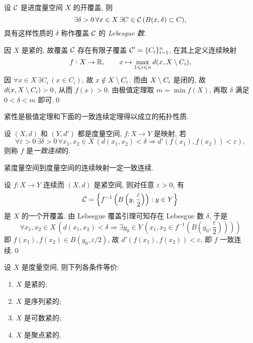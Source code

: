     \begin{Theorem}
        设 $ \mathcal{C} $ 是进度量空间 $ X $ 的开覆盖, 则
        \[
            \exists\delta >0\,\forall x\in X\,\exists C\in\mathcal{C}\,(B(x,\delta)\subset C),
        \]
        具有这样性质的 $ \delta $ 称作覆盖 $ \mathcal{C} $ 的 \emph{Lebesgue 数}.
    \end{Theorem}
    \begin{Proof}
        因 $ X $ 是紧的, 故覆盖 $ \mathcal{C} $ 存在有限子覆盖 $ \mathcal{C}'=\{C_i\}_{i=1}^n $, 在其上定义连续映射
        \[
            f : X\to\mathbb{R},\qquad x\mapsto\max_{1\leqslant i\leqslant n}d(x,X\setminus C_i),
        \]
        因 $ \forall x\in X\,\exists C_i\,(x\in C_i) $, 故 $ x\notin X\setminus C_i $. 而由 $ X\setminus C_i $ 是闭的, 故 $ d(x,X\setminus C_i)>0 $, 从而 $ f(x)>0 $. 由极值定理取 $ m=\min f(X) $, 再取 $ \delta $ 满足 $ 0<\delta<m $ 即可.\qed
    \end{Proof}

    紧性是极值定理和下面的一致连续定理得以成立的拓扑性质.

    \begin{Definition}[一致连续映射]
        设 $ (X,d) $ 和 $ (Y,d') $ 都是度量空间, $ f : X\to Y $ 是映射, 若
        \[
            \forall\varepsilon>0\,\exists\delta>0\,\forall x_1,x_2\in X\,(d(x_1,x_2)<\delta\Rightarrow d'(f(x_1),f(x_2))<\varepsilon),
        \]
        则称 $ f $ 是\emph{一致连续}的.
    \end{Definition}

    \begin{Proposition}
        紧度量空间到度量空间的连续映射一定一致连续.
    \end{Proposition}
    \begin{Proof}
        设 $ f : X\to Y $ 连续而 $ (X,d) $ 是紧空间, 则对任意 $ \varepsilon>0 $, 有
        \[
            \mathcal{C}=\left\{ f^{-1}\left(B\left(y,\frac{\varepsilon}{2}\right)\right) : y\in Y \right\}
        \]
        是 $ X $ 的一个开覆盖. 由 Lebesgue 覆盖引理可知存在 Lebesgue 数 $ \delta $, 于是
        \[
            \forall x_1,x_2\in X\,\left( d(x_1,x_2)<\delta\Rightarrow\exists y_0\in Y\,\left( x_1,x_2\in f^{-1}\left( B\left( y_0,\frac{\varepsilon}{2} \right) \right) \right) \right)
        \]
        即 $ f(x_1),f(x_2)\in B(y_0,\varepsilon/2) $, 故 $ d'(f(x_1),f(x_2))<\varepsilon $, 即 $ f $ 一致连续.\qed
    \end{Proof}

    \begin{Theorem}[紧等价]
        设 $ X $ 是度量空间, 则下列各条件等价:
        \begin{enumerate}
            \item $ X $ 是紧的;
            \item $ X $ 是序列紧的;
            \item $ X $ 是可数紧的;
            \item $ X $ 是聚点紧的.
        \end{enumerate}
    \end{Theorem}

